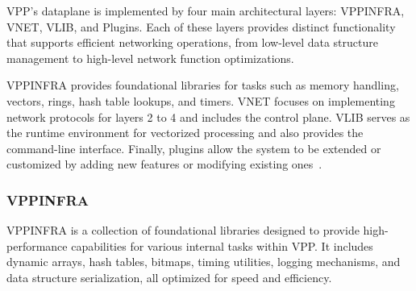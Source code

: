 VPP’s dataplane is implemented by four main architectural layers: VPPINFRA, VNET, VLIB, and Plugins. 
Each of these layers provides distinct functionality that supports efficient networking operations, from low-level data structure management to high-level network function optimizations.

VPPINFRA provides foundational libraries for tasks such as memory handling, vectors, rings, hash table lookups, and timers. 
VNET focuses on implementing network protocols for layers 2 to 4 and includes the control plane. 
VLIB serves as the runtime environment for vectorized processing and also provides the command-line interface. 
Finally, plugins allow the system to be extended or customized by adding new features or modifying existing ones~\cite{fdio-vpp-softwarearchitecture-2506}.

\subsubsection{VPPINFRA}
VPPINFRA is a collection of foundational libraries designed to provide high-performance capabilities for various internal tasks within VPP. 
It includes dynamic arrays, hash tables, bitmaps, timing utilities, logging mechanisms, and data structure serialization, all optimized for speed and efficiency.

